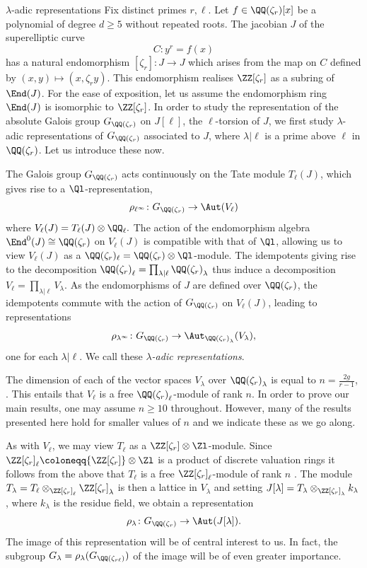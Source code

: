 \documentclass[11pt,a4paper]{article}
\newcommand{\Qr}{{\QQ(\zeta_r)}}
\newcommand{\Zr}{{\ZZ[\zeta_r]}}
\newcommand{\GQr}{G_{\QQ(\zeta_{r})}}
\newcommand{\GQrl}{G_{\QQ(\zeta_{r\ell})}}
\newcommand{\zr}{\zeta_r}
\newcommand{\Glam}{G_{\lambda}}
\begin{document}
\begin{section}{$\lambda$-adic representations}
\label{section_lambda_adic_reps}
Fix distinct primes $r , \ell$. Let $f \in \Qr[x]$ be a polynomial  of degree $d \geq 5$ without repeated roots. The jacobian $J$ of the superelliptic curve
$$C \colon y^r = f(x)$$
has a natural endomorphism $[\zr]\colon J \rightarrow J$ which arises from the map on $C$ defined by $(x,y) \mapsto (x,\zr y)$.
This endomorphism realises $\ZZ[\zr]$ as a subring of $\End(J)$.
For the ease of exposition, let us assume the endomorphism ring $\End(J)$ is isomorphic to $\Zr$.
In order to study the representation of the absolute Galois group $\GQr$ on $J[\ell]$, the $\ell$-torsion of $J$, we first study $\lambda$-adic representations of $\GQr$ associated to $J$, where $\lambda|\ell$ is a prime above $\ell$ in $\Qr$. Let us introduce these now.

The Galois group $\GQr$ acts continuously on the Tate module $T_\ell(J)$, which gives rise to a $\Ql$-representation,
$$\rho_{\ell^\infty}  \colon \GQr \rightarrow \Aut(V_\ell) $$
where $V_\ell(J) = T_\ell(J) \otimes \QQ_\ell.$
The action of the endomorphism algebra $\End^0(J) \cong \QQ(\zeta_r)$ on $V_\ell(J)$ is compatible with that of $\Ql$, allowing us to view $V_\ell(J)$ as a $\QQ(\zeta_r)_\ell = \Qr \otimes \Ql$-module.
The idempotents giving rise to the decomposition $\Qr_\ell = \prod_{\lambda | \ell} \Qr_\lambda$ thus induce a decomposition $V_\ell = \prod_{\lambda | \ell} V_\lambda$.
As the endomorphisms of $J$ are defined over $\Qr$, the idempotents commute with the action of $\GQr$ on $V_\ell(J)$, leading to representations $$ \rho_{\lambda^\infty} \colon \GQr \rightarrow \Aut_{\Qr_\lambda}(V_\lambda),$$
one for each $\lambda|\ell$. We call these  \emph{$\lambda$-adic representations}. 




The dimension of each of the vector spaces $V_\lambda$ over $\Qr_\lambda$ is equal to $n=\frac{2g}{r-1}$, \cite[Thm 2.1.1]{ribet_RM}. This entails that $V_\ell$ is a free $\Qr_\ell$-module of rank $n$.
In order to prove our main results, one may assume $n \geq 10$ throughout.
However, many of the results presented here hold for smaller values of $n$ and we indicate these as we go along.

As with $V_\ell$, we may view $T_\ell$ as a $\Zr \otimes \Zl$-module. Since $\Zr_\ell \coloneqq \Zr \otimes \Zl$ is a product of discrete valuation rings it follows from the above that $T_\ell$ is a free  $\Zr_\ell$-module of rank $n$ \cite[Prop 2.2.1]{ribet_RM}. The module $T_\lambda = T_\ell \otimes_{ \Zr_\ell} \Zr_\lambda$ is then a lattice in $V_\lambda$ 
and setting $J[\lambda] =T_\lambda \otimes_{ \Zr_\lambda} k_\lambda  $, where $k_\lambda$ is the residue field, we obtain a representation
\[\rho_\lambda \colon \GQr \rightarrow \Aut(J[\lambda]).
\]
The image of this representation will be of central interest to us. In fact, the subgroup $\Glam = \rho_\lambda(\GQrl)$ of the image will be of even greater importance.


\end{section}
\end{document}
